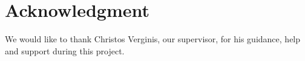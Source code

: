 \documentclass[journal]{IEEEtran}
\begin{document}
	\section*{Acknowledgment}
	We would like to thank Christos Verginis, our supervisor, for his guidance, help and support during this project.
	
	
	
	
\end{document}
